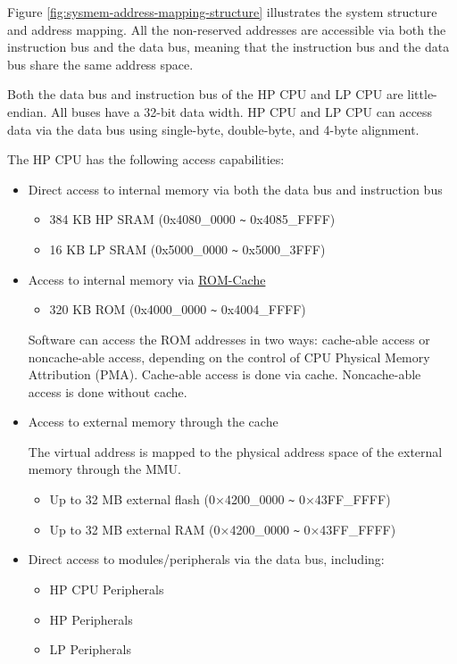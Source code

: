 \documentclass[main\_\_EN.tex]{subfiles}
\begin{document}
Figure \ref{fig:sysmem-address-mapping-structure} illustrates the system structure and address mapping. All the non-reserved addresses are accessible via both the instruction bus and the data bus, meaning that the instruction bus and the data bus share the same address space. 

Both the data bus and instruction bus of the HP CPU and LP CPU are little-endian. All buses have a 32-bit data width. 
HP CPU and LP CPU can access data via the data bus using single-byte, double-byte, and 4-byte alignment.

The HP CPU has the following access capabilities:
\begin{itemize}
\item Direct access to internal memory via both the data bus and instruction bus
  \begin{itemize}
        \item 384 KB HP SRAM (0x4080\_0000 \verb+~+ 0x4085\_FFFF)
        \item 16 KB LP SRAM  (0x5000\_0000 \verb+~+ 0x5000\_3FFF)
    \end{itemize}
\item Access to internal memory via \hyperref[par:rom]{ROM-Cache}
    \begin{itemize}
        \item 320 KB ROM (0x4000\_0000 \verb+~+ 0x4004\_FFFF)
    \end{itemize}
\begin{tiplisting}
Software can access the ROM addresses in two ways: cache-able access or noncache-able access, depending on the control of CPU Physical Memory Attribution (PMA). Cache-able access is done via cache. Noncache-able access is done without cache.
\end{tiplisting}
\item Access to external memory through the cache

The virtual address is mapped to the physical address space of the external memory through the MMU.
    \begin{itemize}
        \item Up to 32 MB external flash (0×4200\_0000 \verb+~+ 0×43FF\_FFFF)
        \item Up to 32 MB external RAM (0×4200\_0000 \verb+~+ 0×43FF\_FFFF)
    \end{itemize}
\item Direct access to modules/peripherals via the data bus, including:
    \begin{itemize}
        \item HP CPU Peripherals
        \item HP Peripherals
        \item LP Peripherals
    \end{itemize}
\end{itemize}
\end{document}
